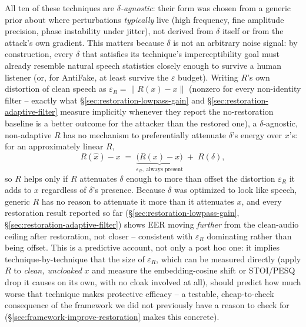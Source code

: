 \documentclass[11pt]{article}
\begin{document}
All ten of these techniques are \emph{$\delta$-agnostic}: their form was
chosen from a generic prior about where perturbations \emph{typically}
live (high
frequency, fine amplitude precision, phase instability under jitter),
not derived from $\delta$ itself or from the attack's own gradient.
This matters because $\delta$ is not an arbitrary noise signal: by
construction, every $\delta$ that satisfies its technique's
imperceptibility goal must already resemble natural speech statistics
closely enough to survive a human listener (or, for AntiFake, at least
survive the $\varepsilon$ budget). Writing $R$'s own distortion of
clean speech as $\varepsilon_R = \|R(x) - x\|$ (nonzero for every
non-identity filter -- exactly what
\S\ref{sec:restoration-lowpass-gain} and
\S\ref{sec:restoration-adaptive-filter} measure implicitly whenever
they report the no-restoration baseline is a better outcome for the
attacker than the restored one), a $\delta$-agnostic, non-adaptive $R$
has no mechanism to preferentially attenuate $\delta$'s energy over
$x$'s: for an approximately linear $R$,
\[
R(\hat{x}) - x \;=\; \underbrace{\big(R(x) - x\big)}_{\varepsilon_R,\ \text{always present}}
\;+\; R(\delta),
\]
so $R$ helps only if $R$ attenuates $\delta$ enough to more than offset
the distortion $\varepsilon_R$ it adds to $x$ regardless of $\delta$'s
presence. Because $\delta$ was optimized to look like speech, generic
$R$ has no reason to attenuate it more than it attenuates $x$, and
every restoration result reported so far (\S\ref{sec:restoration-lowpass-gain},
\S\ref{sec:restoration-adaptive-filter}) shows EER moving \emph{further}
from the clean-audio ceiling after restoration, not closer -- consistent
with $\varepsilon_R$ dominating rather than being offset. This is a
predictive account, not only a post hoc one: it implies technique-by-technique
that the size of $\varepsilon_R$, which can be measured directly (apply
$R$ to \emph{clean, uncloaked} $x$ and measure the embedding-cosine
shift or STOI/PESQ drop it causes on its own, with no cloak involved at
all), should predict how much worse that technique makes protective
efficacy -- a testable, cheap-to-check consequence of the framework we
did not previously have a reason to check for
(\S\ref{sec:framework-improve-restoration} makes this concrete).
\end{document}
